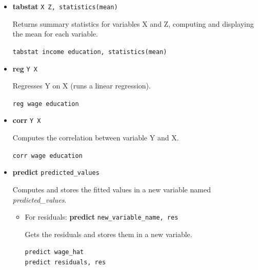 \documentclass{article}
\begin{document}
 \begin{itemize}[leftmargin=*,itemsep=8pt]  
     \item \textcolor{statablue}{\textbf{tabstat}} \texttt{X Z, statistics(mean)}   
       
     Returns summary statistics for variables X and Z, computing and displaying the mean for each variable.  
       
     \begin{tcolorbox}[colback=lightgray!50,colframe=lightgray!20,boxrule=0.5pt]  
     \texttt{tabstat income education, statistics(mean)}  
     \end{tcolorbox}  
   
     \item \textcolor{statablue}{\textbf{reg}} \texttt{Y X}   
       
     Regresses Y on X (runs a linear regression).  
       
     \begin{tcolorbox}[colback=lightgray!50,colframe=lightgray!20,boxrule=0.5pt]  
     \texttt{reg wage education}  
     \end{tcolorbox}  

    \item \textcolor{statablue}{\textbf{corr}} \texttt{Y X}   
       
     Computes the correlation between variable Y and X.  
       
     \begin{tcolorbox}[colback=lightgray!50,colframe=lightgray!20,boxrule=0.5pt]  
     \texttt{corr wage education}  
     \end{tcolorbox}  
   
     \item \textcolor{statablue}{\textbf{predict}} \texttt{predicted\_values}   
       
     Computes and stores the fitted values in a new variable named \textit{predicted\_values}.  
       
     \begin{itemize}  
         \item For residuals: \textcolor{statablue}{\textbf{predict}} \texttt{new\_variable\_name, res}  
           
         Gets the residuals and stores them in a new variable.  
           
         \begin{tcolorbox}[colback=lightgray!50,colframe=lightgray!20,boxrule=0.5pt]  
         \texttt{predict wage\_hat}\\  
         \texttt{predict residuals, res}  
         \end{tcolorbox}  
     \end{itemize}  
   

\end{itemize}
\end{document}
